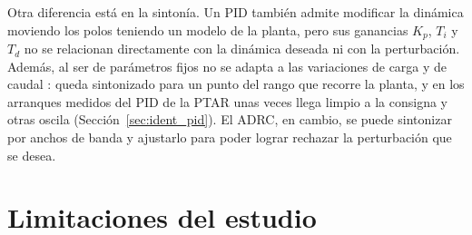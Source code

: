 Otra diferencia está en la sintonía. Un PID también admite modificar la dinámica moviendo los polos
teniendo un modelo de la planta, pero sus ganancias $K_p$, $T_i$ y $T_d$ no se relacionan directamente
con la dinámica deseada ni con la perturbación. Además, al ser de parámetros fijos no se adapta a las
variaciones de carga y de caudal \cite{qiao2016self}: queda sintonizado para un punto del rango que
recorre la planta, y en los arranques medidos del PID de la PTAR unas veces llega limpio a la consigna
y otras oscila (Sección~\ref{sec:ident_pid}). El ADRC, en cambio, se puede sintonizar por anchos de
banda \cite{gao2003scaling} y ajustarlo para poder lograr rechazar la perturbación que se desea.

\section{Limitaciones del estudio}
\label{sec:limitaciones}

